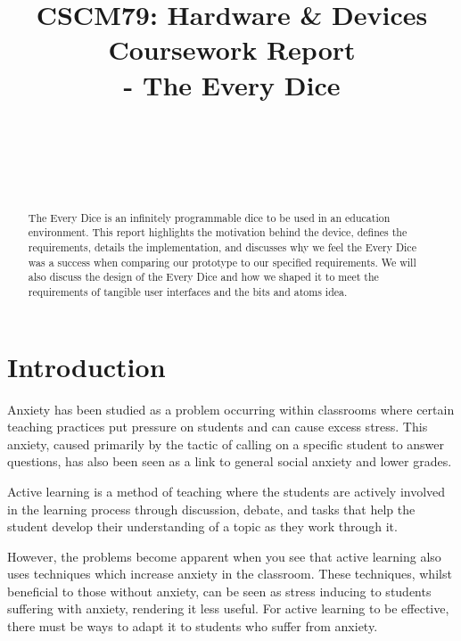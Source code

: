 \documentclass{sigchi}
\begin{document}
\title{CSCM79: Hardware \& Devices Coursework Report \\- The Every Dice}

\author{%
  \\
  \\
  \\
  \\
}

\maketitle

\begin{abstract}

The Every Dice is an infinitely programmable dice to be used in an education environment. This report highlights the motivation behind the device, defines the requirements, details the implementation, and discusses why we feel the Every Dice was a success when comparing our prototype to our specified requirements. We will also discuss the design of the Every Dice and how we shaped it to meet the requirements of tangible user interfaces and the bits and atoms idea.

\end{abstract}

\section{Introduction}

Anxiety has been studied as a problem occurring within classrooms where certain teaching practices put pressure on students and can cause excess stress. This anxiety, caused primarily by the tactic of calling on a specific student to answer questions, has also been seen as a link to general social anxiety and lower grades.  

Active learning is a method of teaching where the students are actively involved in the learning process through discussion, debate, and tasks that help the student develop their understanding of a topic as they work through it. 

However, the problems become apparent when you see that active learning also uses techniques which increase anxiety in the classroom. These techniques, whilst beneficial to those without anxiety, can be seen as stress inducing to students suffering with anxiety, rendering it less useful. For active learning to be effective, there must be ways to adapt it to students who suffer from anxiety. 
\end{document}
